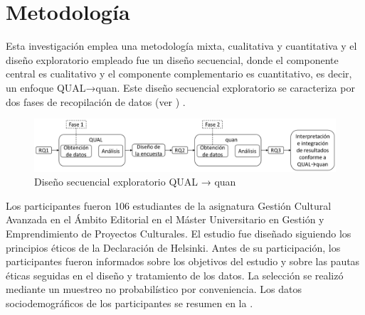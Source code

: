 \documentclass[spanish]{textolivre}
\begin{document}
\section{Metodología}\label{sec-3}
Esta investigación emplea una metodología mixta, cualitativa y cuantitativa y el diseño exploratorio empleado fue un diseño secuencial, donde el componente central es cualitativo y el componente complementario es cuantitativo, es decir, un enfoque QUAL→quan. Este diseño secuencial exploratorio se caracteriza por dos fases de recopilación de datos (ver ) \cite{schoonenboom2017}.

\begin{figure}[htbp]
 \centering
 \includegraphics[width=\textwidth]{36941-fig1.png}
 \caption{Diseño secuencial exploratorio QUAL → quan}
 \label{fig1}
\end{figure}

Los participantes fueron 106 estudiantes de la asignatura Gestión Cultural Avanzada en el Ámbito Editorial en el Máster Universitario en Gestión y Emprendimiento de Proyectos Culturales. El estudio fue diseñado siguiendo los principios éticos de la Declaración de Helsinki. Antes de su participación, los participantes fueron informados sobre los objetivos del estudio y sobre las pautas éticas seguidas en el diseño y tratamiento de los datos. La selección se realizó mediante un muestreo no probabilístico por conveniencia. Los datos sociodemográficos de los participantes se resumen en la .
\end{document}
